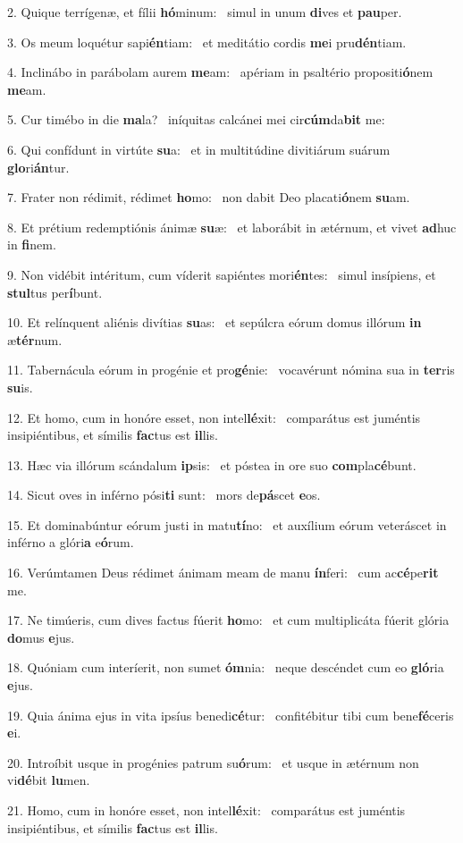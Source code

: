 2. Quique terrígenæ, et fílii \textbf{hó}minum: \ast\  simul in unum \textbf{di}ves et \textbf{pau}per.\

3. Os meum loquétur sapi\textbf{én}tiam: \ast\  et meditátio cordis \textbf{me}i pru\textbf{dén}tiam.\

4. Inclinábo in parábolam aurem \textbf{me}am: \ast\  apériam in psaltério propositi\textbf{ó}nem \textbf{me}am.\

5. Cur timébo in die \textbf{ma}la? \ast\  iníquitas calcánei mei cir\textbf{cúm}da\textbf{bit} me:\

6. Qui confídunt in virtúte \textbf{su}a: \ast\  et in multitúdine divitiárum suárum \textbf{glo}ri\textbf{án}tur.\

7. Frater non rédimit, rédimet \textbf{ho}mo: \ast\  non dabit Deo placati\textbf{ó}nem \textbf{su}am.\

8. Et prétium redemptiónis ánimæ \textbf{su}æ: \ast\  et laborábit in ætérnum, et vivet \textbf{ad}huc in \textbf{fi}nem.\

9. Non vidébit intéritum, cum víderit sapiéntes mori\textbf{én}tes: \ast\  simul insípiens, et \textbf{stul}tus per\textbf{í}bunt.\

10. Et relínquent aliénis divítias \textbf{su}as: \ast\  et sepúlcra eórum domus illórum \textbf{in} æ\textbf{tér}num.\

11. Tabernácula eórum in progénie et pro\textbf{gé}nie: \ast\  vocavérunt nómina sua in \textbf{ter}ris \textbf{su}is.\

12. Et homo, cum in honóre esset, non intel\textbf{lé}xit: \ast\  comparátus est juméntis insipiéntibus, et símilis \textbf{fac}tus est \textbf{il}lis.\

13. Hæc via illórum scándalum \textbf{ip}sis: \ast\  et póstea in ore suo \textbf{com}pla\textbf{cé}bunt.\

14. Sicut oves in inférno pósi\textbf{ti} sunt: \ast\  mors de\textbf{pá}scet \textbf{e}os.\

15. Et dominabúntur eórum justi in matu\textbf{tí}no: \ast\  et auxílium eórum veteráscet in inférno a glóri\textbf{a} e\textbf{ó}rum.\

16. Verúmtamen Deus rédimet ánimam meam de manu \textbf{ín}feri: \ast\  cum ac\textbf{cé}pe\textbf{rit} me.\

17. Ne timúeris, cum dives factus fúerit \textbf{ho}mo: \ast\  et cum multiplicáta fúerit glória \textbf{do}mus \textbf{e}jus.\

18. Quóniam cum interíerit, non sumet \textbf{óm}nia: \ast\  neque descéndet cum eo \textbf{gló}ria \textbf{e}jus.\

19. Quia ánima ejus in vita ipsíus benedi\textbf{cé}tur: \ast\  confitébitur tibi cum bene\textbf{fé}ceris \textbf{e}i.\

20. Introíbit usque in progénies patrum su\textbf{ó}rum: \ast\  et usque in ætérnum non vi\textbf{dé}bit \textbf{lu}men.\

21. Homo, cum in honóre esset, non intel\textbf{lé}xit: \ast\  comparátus est juméntis insipiéntibus, et símilis \textbf{fac}tus est \textbf{il}lis.\

